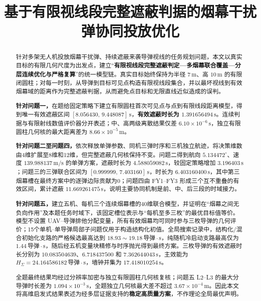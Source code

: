 \documentclass{cumcmthesis}
\title{基于有限视线段完整遮蔽判据的烟幕干扰弹协同投放优化}
\newcommand{\abslead}[1]{{\sffamily\bfseries #1}}
\newcommand{\absstrong}[1]{{\sffamily\bfseries\boldmath #1}}
\begin{document}
\maketitle
\begin{abstract}
\setlength{\parindent}{2em}
\setlength{\parskip}{0.10em}
针对多架无人机投放烟幕干扰弹、持续遮蔽来袭导弹视线的任务规划问题，本文以真实目标的有限几何尺度为出发点，建立“\absstrong{有限视线段完整遮蔽判定—多烟幕联合覆盖—分层连续优化与严格复算}”的统一模型链。真实目标始终保持为半径 $7\,\mathrm m$、高 $10\,\mathrm m$ 的有限闭圆柱；对每一时刻，从导弹到目标可见点构造有限视线段集合，并以最坏视线到有效烟幕域的距离作为完整遮蔽判据，从而避免点目标和无限直线近似造成的误判。

\abslead{针对问题一，}在题给固定策略下建立有限圆柱首次可见点与点到有限线段距离模型，得到唯一有效遮蔽区间 $[8.056430,\,9.448087]\,\mathrm s$，\absstrong{有效遮蔽时长为 $1.391656494\,\mathrm s$}。连续判据与有限射线数值评价器分开表述；中、高两级离散结果仅差 $6.10\times10^{-6}\,\mathrm s$，独立有限圆柱几何核的最大距离差为 $8.66\times10^{-5}\,\mathrm m$。

\abslead{针对问题二至问题四，}依次释放单弹参数、同机三弹时序和三机独立航迹，将决策维数由4维扩展至8维和12维，但完整遮蔽几何核保持不变。问题二得到航向 $5.134472^\circ$、速度 $139.988137\,\mathrm{m/s}$ 的单弹方案，遮蔽时长为 \absstrong{$4.588059082\,\mathrm s$}，较固定策略增加 $3.196403\,\mathrm s$；问题三的三弹联合区间为 $[0.999999,\,7.403160]\,\mathrm s$，时长为 \absstrong{$6.403160400\,\mathrm s$}，其中第三烟幕槽在最终方案中的逐弹边际贡献为0；问题四由 FY1--FY3 形成三个互不重叠的有效区间，累计遮蔽 \absstrong{$11.669261475\,\mathrm s$}，说明主要协同机制是前、中、后三段的时域接力。

\abslead{针对问题五，}建立五机、每机三个连续烟幕槽的40维联合模型，并证明在“烟幕之间无负向作用”及本题任务时域下，该固定槽位表示与“每机至多三枚”的最优目标值等价。模型不设置 UAV--导弹排他分配变量，所有有效烟幕均可同时参与三枚导弹的几何评价；15个单机--单导弹局部子问题仅用于构造结构化初值。全局搜索记录中，结构化/混合初始化支路的严格候选最高达到 $18.93\sim19.18\,\text{导弹}\cdot\mathrm s$，纯随机冷启动支路最高仅为 $1.44\,\text{导弹}\cdot\mathrm s$，随后经五机变量块精修与时序抛光得到最终方案。三枚导弹的有效遮蔽时长分别为 $10.083504639$、$6.718437500$ 和 $7.362644043\,\mathrm s$，主效能为 \absstrong{$H_\Sigma=24.164586182\,\text{导弹}\cdot\mathrm s$}，墙钟并集为 $17.418010254\,\mathrm s$。

全题最终结果均经过分辨率加密与独立有限圆柱几何核复核；问题五 L2--L3 的最大分导弹时长差为 $1.094\times10^{-3}\,\mathrm s$，全题独立几何核最大差不超过 $3.67\times10^{-4}\,\mathrm m$。因此本文将高维启发式结果表述为经多层证据支持的\absstrong{稳定高质量方案}，不作理论全局最优声明。
\end{abstract}

\clearpage








\end{document}
